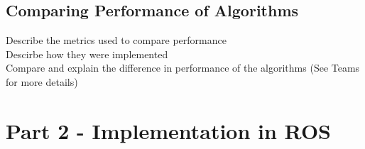 \documentclass[a4paper,12pt]{article}
\begin{document}
			\subsection{Comparing Performance of Algorithms}

		Describe the metrics used to compare performance \\
		Descirbe how they were implemented \\
		Compare and explain the difference in performance of the algorithms (See Teams for more details)


	\section{Part 2 - Implementation in ROS}
	
\end{document}
